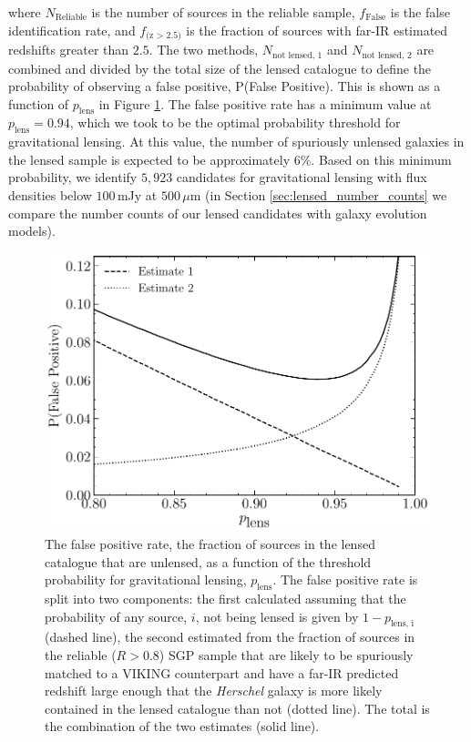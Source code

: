 \noindent where $N_{\textrm{Reliable}}$ is the number of sources in the reliable sample, $f_{\textrm{False}}$ is the false identification rate, and $f_{\textrm{(z > 2.5)}}$ is the fraction of sources with far-IR estimated redshifts greater than $2.5$. The two methods, $N_{\textrm{not lensed, 1}}$ and $N_{\textrm{not lensed, 2}}$ are combined and divided by the total size of the lensed catalogue to define the probability of observing a false positive, P(False Positive). This is shown as a function of $p_{\textrm{lens}}$ in Figure \ref{fig:lens_false_positive}. The false positive rate has a minimum value at $p_\textrm{lens} = 0.94$, which we took to be the optimal probability threshold for gravitational lensing. At this value, the number of spuriously unlensed galaxies in the lensed sample is expected to be approximately $6\%$. Based on this minimum probability, we identify $5,923$ candidates for gravitational lensing with flux densities below $100\,$mJy at $500\,\mu$m (in Section \ref{sec:lensed_number_counts} we compare the number counts of our lensed candidates with galaxy evolution models).

\begin{figure}
    \centering
    \includegraphics[width=0.62\columnwidth]{Figures/Figure_2_11.pdf}
    \caption[Fraction of unlensed sources in our lensed sample as a function of $p_\textrm{lens}$]{The false positive rate, the fraction of sources in the lensed catalogue that are unlensed, as a function of the threshold probability for gravitational lensing, $p_\textrm{lens}$. The false positive rate is split into two components: the first calculated assuming that the probability of any source, $i$, not being lensed is given by $1 - p_{\textrm{lens, i}}$ (dashed line), the second estimated from the fraction of sources in the reliable ($R > 0.8$) SGP sample that are likely to be spuriously matched to a VIKING counterpart and have a far-IR predicted redshift large enough that the \textit{Herschel} galaxy is more likely contained in the lensed catalogue than not (dotted line). The total is the combination of the two estimates (solid line).}
    \label{fig:lens_false_positive}
\end{figure}

